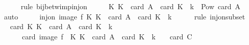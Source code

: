 \begin{isabellebody}
\ \ \ \ \isamarkupfalse%
\ {\isacharparenleft}{\kern0pt}rule\ bij{\isacharunderscore}{\kern0pt}betw{\isacharunderscore}{\kern0pt}imp{\isacharunderscore}{\kern0pt}inj{\isacharunderscore}{\kern0pt}on{\isacharparenright}{\kern0pt}\isanewline
\ \ \isamarkupfalse%
\ \isamarkupfalse%
\ {\isachardoublequoteopen}{\isacharbraceleft}{\kern0pt}K{\isachardot}{\kern0pt}\ K\ {\isasymsubseteq}\ {\isacharbraceleft}{\kern0pt}{}{\isachardot}{\kern0pt}{\isachardot}{\kern0pt}{\isacharless}{\kern0pt}card\ A{\isacharbraceright}{\kern0pt}\ {\isasymand}\ card\ K\ {\isacharequal}{\kern0pt}\ k{\isacharbraceright}{\kern0pt}\ {\isasymsubseteq}\ Pow\ {\isacharbraceleft}{\kern0pt}{}{\isachardot}{\kern0pt}{\isachardot}{\kern0pt}{\isacharless}{\kern0pt}card\ A{\isacharbraceright}{\kern0pt}{\isachardoublequoteclose}\isanewline
\ \ \ \ \isamarkupfalse%
\ auto\isanewline
\ \ \isamarkupfalse%
\ \isamarkupfalse%
\ {\isachardoublequoteopen}inj{\isacharunderscore}{\kern0pt}on\ {\isacharparenleft}{\kern0pt}image\ f{\isacharparenright}{\kern0pt}\ {\isacharbraceleft}{\kern0pt}K{\isachardot}{\kern0pt}\ K\ {\isasymsubseteq}\ {\isacharbraceleft}{\kern0pt}{}{\isachardot}{\kern0pt}{\isachardot}{\kern0pt}{\isacharless}{\kern0pt}card\ A{\isacharbraceright}{\kern0pt}\ {\isasymand}\ card\ K\ {\isacharequal}{\kern0pt}\ k{\isacharbraceright}{\kern0pt}{\isachardoublequoteclose}\isanewline
\ \ \ \ \isamarkupfalse%
\ {\isacharparenleft}{\kern0pt}rule\ inj{\isacharunderscore}{\kern0pt}on{\isacharunderscore}{\kern0pt}subset{\isacharparenright}{\kern0pt}\isanewline
\ \ \isamarkupfalse%
\ \isamarkupfalse%
\ {\isachardoublequoteopen}card\ {\isacharbraceleft}{\kern0pt}K{\isachardot}{\kern0pt}\ K\ {\isasymsubseteq}\ {\isacharbraceleft}{\kern0pt}{}{\isachardot}{\kern0pt}{\isachardot}{\kern0pt}{\isacharless}{\kern0pt}card\ A{\isacharbraceright}{\kern0pt}\ {\isasymand}\ card\ K\ {\isacharequal}{\kern0pt}\ k{\isacharbraceright}{\kern0pt}\ {\isacharequal}{\kern0pt}\isanewline
\ \ \ \ \ \ card\ {\isacharparenleft}{\kern0pt}image\ f\ {\isacharbackquote}{\kern0pt}\ {\isacharbraceleft}{\kern0pt}K{\isachardot}{\kern0pt}\ K\ {\isasymsubseteq}\ {\isacharbraceleft}{\kern0pt}{}{\isachardot}{\kern0pt}{\isachardot}{\kern0pt}{\isacharless}{\kern0pt}card\ A{\isacharbraceright}{\kern0pt}\ {\isasymand}\ card\ K\ {\isacharequal}{\kern0pt}\ k{\isacharbraceright}{\kern0pt}{\isacharparenright}{\kern0pt}{\isachardoublequoteclose}\ {\isacharparenleft}{\kern0pt}\ {\isachardoublequoteopen}{\isacharunderscore}{\kern0pt}\ {\isacharequal}{\kern0pt}\ card\ {\isacharquery}{\kern0pt}C{\isachardoublequoteclose}{\isacharparenright}{\kern0pt}\isanewline

\end{isabellebody}
